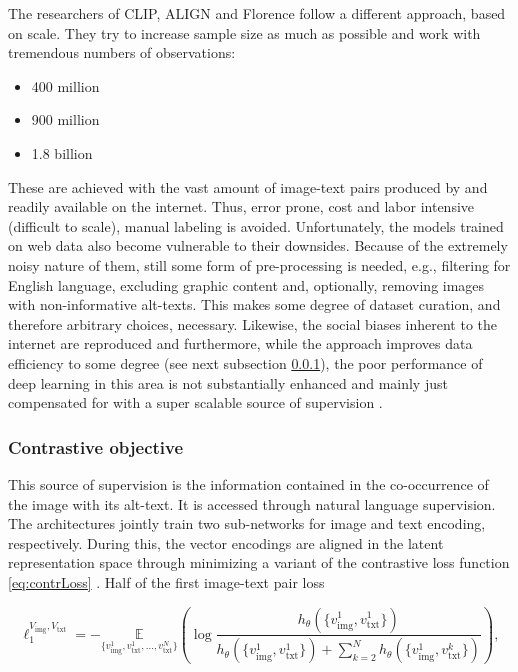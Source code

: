 \documentclass[
]{krantz}
\providecommand{\tightlist}{%
  \setlength{\itemsep}{0pt}\setlength{\parskip}{0pt}}
\begin{document}
The researchers of CLIP, ALIGN and Florence follow a different approach, based on scale.
They try to increase sample size as much as possible and work with tremendous numbers of observations:

\begin{itemize}
\tightlist
\item
  400 million \citep[CLIP;][]{radford2021learning}
\item
  900 million \citep[Florence;][]{yuan2021florence}
\item
  1.8 billion \citep[ALIGN;][]{jia2021scaling}
\end{itemize}

These are achieved with the vast amount of image-text pairs produced by and readily available on the internet.
Thus, error prone, cost and labor intensive (difficult to scale), manual labeling is avoided.
Unfortunately, the models trained on web data also become vulnerable to their downsides.
Because of the extremely noisy nature of them, still some form of pre-processing is needed, e.g., filtering for English language, excluding graphic content and, optionally, removing images with non-informative alt-texts.
This makes some degree of dataset curation, and therefore arbitrary choices, necessary.
Likewise, the social biases inherent to the internet are reproduced and furthermore, while the approach improves data efficiency to some degree (see next subsection \ref{contrObj}), the poor performance of deep learning in this area is not substantially enhanced and mainly just compensated for with a super scalable source of supervision \citep{radford2021learning}.

\hypertarget{contrObj}{%
\subsubsection{Contrastive objective}\label{contrObj}}

This source of supervision is the information contained in the co-occurrence of the image with its alt-text.
It is accessed through natural language supervision.
The architectures jointly train two sub-networks for image and text encoding, respectively.
During this, the vector encodings are aligned in the latent representation space through minimizing a variant of the contrastive loss function \eqref{eq:contrLoss} \citep{tian2020contrastive}.
Half of the first image-text pair loss

\begin{equation}
  \ell_1^{V_\text{img}, V_\text{txt}} = - \underset{\{v_\text{img}^1, v_\text{txt}^1, \ldots, v_\text{txt}^N\}}{\mathbb{E}} \left( \log \frac{h_\theta(\{v_\text{img}^1,v_\text{txt}^1\})}{h_\theta(\{v_\text{img}^1,v_\text{txt}^1\}) + \sum_{k=2}^N h_\theta(\{v_\text{img}^1, v_\text{txt}^k\})} \right),
  \label{eq:contrLoss}
\end{equation}
\end{document}
